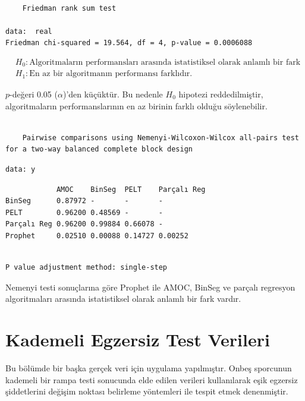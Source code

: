 \documentclass[12pt,twoside]{deuthesis}
\begin{document}
\begin{verbatim}

    Friedman rank sum test

data:  real
Friedman chi-squared = 19.564, df = 4, p-value = 0.0006088
\end{verbatim}

\begin{align*}
&H_0:\text{Algoritmaların performansları arasında istatistiksel olarak anlamlı bir fark yoktur.} \\
&H_1:\text{En az bir algoritmanın performansı farklıdır.}
\end{align*}

\(p\)-değeri 0.05 (\(\alpha\))'den küçüktür. Bu nedenle \(H_0\) hipotezi reddedilmiştir, algoritmaların performanslarının en az birinin farklı olduğu söylenebilir.

\begin{verbatim}

    Pairwise comparisons using Nemenyi-Wilcoxon-Wilcox all-pairs test for a two-way balanced complete block design
\end{verbatim}

\begin{verbatim}
data: y
\end{verbatim}

\begin{verbatim}
            AMOC    BinSeg  PELT    Parçalı Reg
BinSeg      0.87972 -       -       -          
PELT        0.96200 0.48569 -       -          
Parçalı Reg 0.96200 0.99884 0.66078 -          
Prophet     0.02510 0.00088 0.14727 0.00252    
\end{verbatim}

\begin{verbatim}

P value adjustment method: single-step
\end{verbatim}

Nemenyi testi sonuçlarına göre Prophet ile AMOC, BinSeg ve parçalı regresyon algoritmaları arasında istatistiksel olarak anlamlı bir fark vardır.

\section{Kademeli Egzersiz Test Verileri}\label{kademeli-egzersiz-test-verileri}

Bu bölümde bir başka gerçek veri için uygulama yapılmıştır. Onbeş sporcunun kademeli bir rampa testi sonucunda elde edilen verileri kullanılarak eşik egzersiz şiddetlerini değişim noktası belirleme yöntemleri ile tespit etmek denenmiştir.
\end{document}
